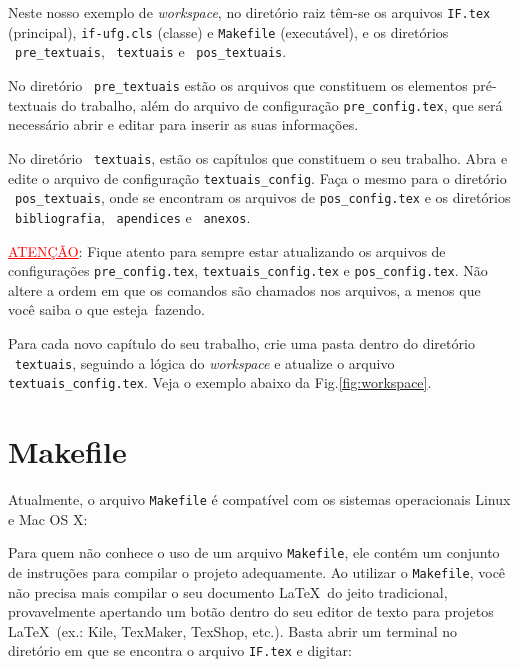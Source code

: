 Neste nosso exemplo de \emph{workspace}, no diretório raiz têm-se os arquivos \texttt{IF.tex} (principal), \texttt{if-ufg.cls} (classe) e \texttt{Makefile} (executável), e os diretórios \drawtikzfolder\ \texttt{pre\_textuais}, \mbox{\drawtikzfolder\ \texttt{textuais}} e \drawtikzfolder\ \texttt{pos\_textuais}. 

No diretório \drawtikzfolder\ \texttt{pre\_textuais} estão os arquivos que constituem os elementos pré-textuais do trabalho, além do arquivo de configuração \texttt{pre\_config.tex}, que será necessário abrir e editar para inserir as suas informações.

No diretório \drawtikzfolder\ \texttt{textuais}, estão os capítulos que constituem o seu trabalho. Abra e edite o arquivo de configuração \texttt{textuais\_config}. Faça o mesmo para o diretório \mbox{\drawtikzfolder\ \texttt{pos\_textuais}}, onde se encontram os arquivos de \texttt{pos\_config.tex} e os diretórios \mbox{\drawtikzfolder\ \texttt{bibliografia}}, \drawtikzfolder\ \texttt{apendices} e \drawtikzfolder\ \texttt{anexos}.

\vspace{20pt}
\noindent
\textcolor{red}{\uline{ATENÇÃO}}: Fique atento para sempre estar atualizando os arquivos de configurações \texttt{pre\_config.tex}, \texttt{textuais\_config.tex} e \texttt{pos\_config.tex}. Não altere a ordem em que os comandos são chamados nos arquivos, a menos que você saiba o que \mbox{esteja fazendo.}
\vspace{20pt}

Para cada novo capítulo do seu trabalho, crie uma pasta dentro do diretório \mbox{\drawtikzfolder\ \texttt{textuais}}, seguindo a lógica do \emph{workspace} e atualize o arquivo \texttt{textuais\_config.tex}. Veja o exemplo abaixo da Fig.\ref{fig:workspace}.

\section{Makefile}

Atualmente, o arquivo \texttt{Makefile} é compatível com os sistemas operacionais Linux e Mac OS X:


Para quem não conhece o uso de um arquivo \texttt{Makefile}, ele contém um conjunto de instruções para compilar o projeto adequamente. Ao utilizar o \texttt{Makefile}, você não precisa mais compilar o seu documento \LaTeX\ do jeito tradicional, provavelmente apertando um botão dentro do seu editor de texto para projetos \LaTeX\ (ex.: Kile, TexMaker, TexShop, etc.). Basta abrir um terminal no diretório em que se encontra o arquivo \texttt{IF.tex} e digitar:\vspace{15pt}

